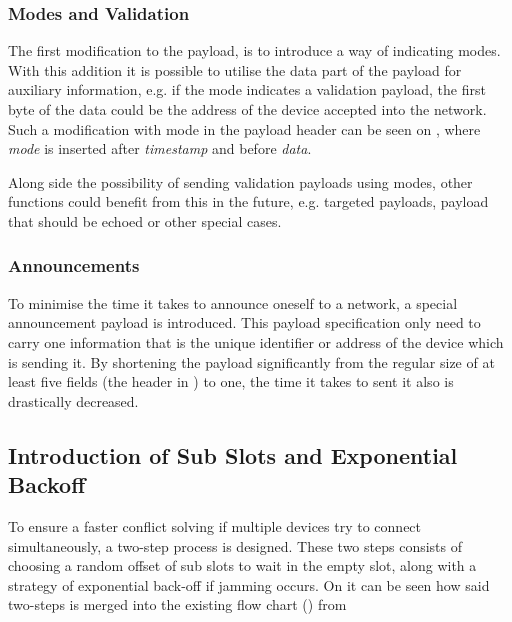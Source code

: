\subsubsection{Modes and Validation} %
\label{ssub:modes_and_validation}
The first modification to the payload, is to introduce a way of indicating modes.
With this addition it is possible to utilise the data part of the payload for auxiliary information, e.g. if the mode indicates a validation payload, the first byte of the data could be the address of the device accepted into the network.
Such a modification with mode in the payload header can be seen on , where \emph{mode} is inserted after \emph{timestamp} and before \emph{data}. 


\noindent
Along side the possibility of sending validation payloads using modes, other functions could benefit from this in the future, e.g. targeted payloads, payload that should be echoed or other special cases.

\subsubsection{Announcements} %
\label{ssub:announcements}
To minimise the time it takes to announce oneself to a network, a special announcement payload is introduced.
This payload specification only need to carry one information that is the unique identifier or address of the device which is sending it.
By shortening the payload significantly from the regular size of at least five fields (the header in ) to one, the time it takes to sent it also is drastically decreased.


\subsection{Introduction of Sub Slots and Exponential Backoff} %
\label{sub:introduction_of_sub_slots_and_exponential_backoff}
To ensure a faster conflict solving if multiple devices try to connect simultaneously, a two-step process is designed.
These two steps consists of choosing a random offset of sub slots to wait in the empty slot, along with a strategy of exponential back-off if jamming occurs.
On  it can be seen how said two-steps is merged into the existing flow chart () from 

